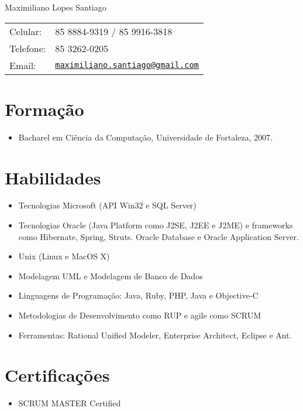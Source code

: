 \documentclass[letterpaper]{article}
\def\name{Maximiliano Lopes Santiago}
\begin{document}
\begin{flushright}

{\huge \name}


\vspace{0.25in}
\begin{minipage}{0.45\linewidth}
  \begin{tabular}{ll}
    Celular: & 85 8884-9319 / 85 9916-3818 \\
    Telefone: & 85 3262-0205 \\
    Email: & \href{mailto:maximiliano.santiago@gmail.com}{\tt maximiliano.santiago@gmail.com} \\
  \end{tabular}
\end{minipage}
\end{flushright}

\section*{Formação}

\begin{itemize}
  \item Bacharel em Ciência da Computação, Universidade de Fortaleza, 2007.
\end{itemize}

\section*{Habilidades}
\begin{itemize}
  \item Tecnologias Microsoft (API Win32 e SQL Server)
  \item Tecnologias Oracle (Java Platform como J2SE, J2EE e J2ME) e frameworks como Hibernate, Spring, Struts.
    Oracle Database e Oracle Application Server.
  \item Unix (Linux e MacOS X)
  \item Modelagem UML e Modelagem de Banco de Dados
  \item Linguagens de Programação: Java, Ruby, PHP, Java e Objective-C
  \item Metodologias de Desenvolvimento como RUP e agile como SCRUM
  \item Ferramentas: Rational Unified Modeler, Enterprise Architect, Eclipse e Ant.
\end{itemize}

\section*{Certificações}
\begin{itemize}
  \item SCRUM MASTER Certified
\end{itemize}
\end{document}
